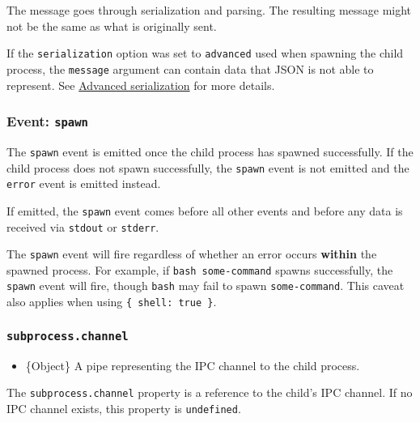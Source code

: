 The message goes through serialization and parsing. The resulting
message might not be the same as what is originally sent.

If the \texttt{serialization} option was set to
\texttt{\textquotesingle{}advanced\textquotesingle{}} used when spawning
the child process, the \texttt{message} argument can contain data that
JSON is not able to represent. See
\hyperref[advanced-serialization]{Advanced serialization} for more
details.

\subsubsection{\texorpdfstring{Event:
\texttt{\textquotesingle{}spawn\textquotesingle{}}}{Event: \textquotesingle spawn\textquotesingle{}}}\label{event-spawn}

The \texttt{\textquotesingle{}spawn\textquotesingle{}} event is emitted
once the child process has spawned successfully. If the child process
does not spawn successfully, the
\texttt{\textquotesingle{}spawn\textquotesingle{}} event is not emitted
and the \texttt{\textquotesingle{}error\textquotesingle{}} event is
emitted instead.

If emitted, the \texttt{\textquotesingle{}spawn\textquotesingle{}} event
comes before all other events and before any data is received via
\texttt{stdout} or \texttt{stderr}.

The \texttt{\textquotesingle{}spawn\textquotesingle{}} event will fire
regardless of whether an error occurs \textbf{within} the spawned
process. For example, if \texttt{bash\ some-command} spawns
successfully, the \texttt{\textquotesingle{}spawn\textquotesingle{}}
event will fire, though \texttt{bash} may fail to spawn
\texttt{some-command}. This caveat also applies when using
\texttt{\{\ shell:\ true\ \}}.

\subsubsection{\texorpdfstring{\texttt{subprocess.channel}}{subprocess.channel}}\label{subprocess.channel}

\begin{itemize}
\tightlist
\item
  \{Object\} A pipe representing the IPC channel to the child process.
\end{itemize}

The \texttt{subprocess.channel} property is a reference to the child's
IPC channel. If no IPC channel exists, this property is
\texttt{undefined}.

